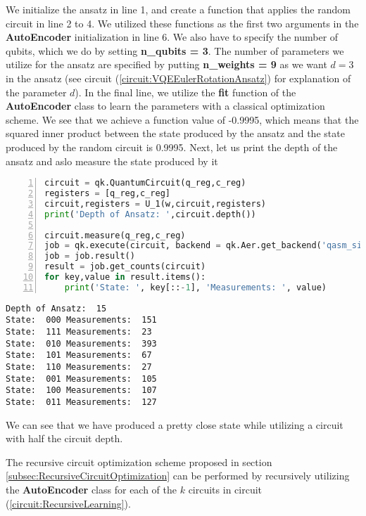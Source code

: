 We initialize the ansatz in line 1, and create a function that applies the random circuit in line 2 to 4. We utilized these functions as the first two arguments in the \textbf{AutoEncoder} initialization in line 6. We also have to specify the number of qubits, which we do by setting \textbf{n\_qubits = 3}. The number of parameters we utilize for the ansatz are specified by putting \textbf{n\_weights = 9} as we want $d=3$ in the ansatz (see circuit (\ref{circuit:VQEEulerRotationAnsatz}) for explanation of the parameter $d$). In the final line, we utilize the \textbf{fit} function of the \textbf{AutoEncoder} class to learn the parameters with a classical optimization scheme. 
We see that we achieve a function value of -0.9995, which means that the squared inner product between the state produced by the ansatz and the state produced by the random circuit is 0.9995.
Next, let us print the depth of the ansatz and aslo measure the state produced by it
\begin{lstlisting}[language=Python,numbers=left]
circuit = qk.QuantumCircuit(q_reg,c_reg)
registers = [q_reg,c_reg]
circuit,registers = U_1(w,circuit,registers)
print('Depth of Ansatz: ',circuit.depth())

circuit.measure(q_reg,c_reg)
job = qk.execute(circuit, backend = qk.Aer.get_backend('qasm_simulator'),seed_simulator=42,shots=1000)
job = job.result()
result = job.get_counts(circuit)
for key,value in result.items():
    print('State: ', key[::-1], 'Measurements: ', value)
\end{lstlisting}
\begin{verbatim}
Depth of Ansatz:  15
State:  000 Measurements:  151
State:  111 Measurements:  23
State:  010 Measurements:  393
State:  101 Measurements:  67
State:  110 Measurements:  27
State:  001 Measurements:  105
State:  100 Measurements:  107
State:  011 Measurements:  127
\end{verbatim}
We can see that we have produced a pretty close state while utilizing a circuit with half the circuit depth.

\bigskip

The recursive circuit optimization scheme proposed in section \ref{subsec:RecursiveCircuitOptimization} can be performed by recursively utilizing the \textbf{AutoEncoder} class for each of the $k$ circuits in circuit (\ref{circuit:RecursiveLearning}).

